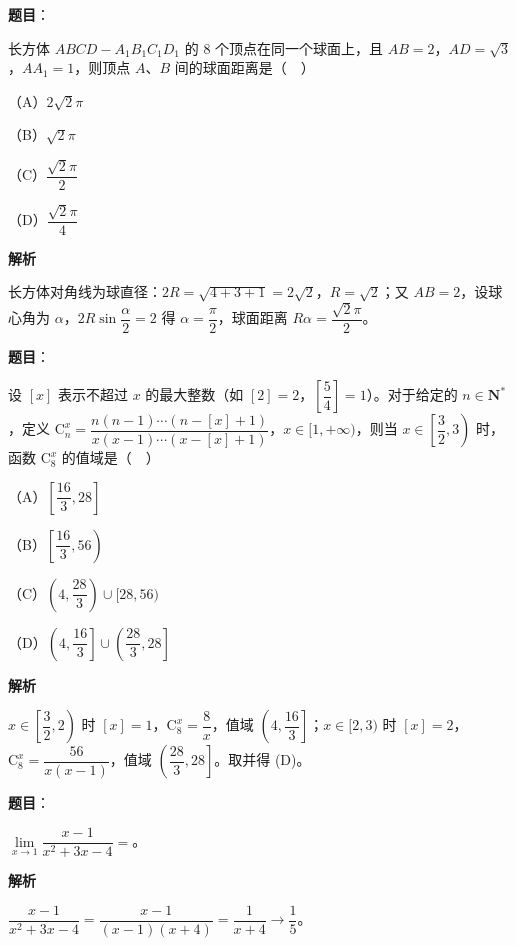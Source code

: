 \begin{answer}

\textbf{题目}：

长方体 $ABCD-A_1B_1C_1D_1$ 的 $8$ 个顶点在同一个球面上，且 $AB=2$，$AD=\sqrt3$，$AA_1=1$，则顶点 $A$、$B$ 间的球面距离是（　）

（A）$2\sqrt2\pi$

（B）$\sqrt2\pi$

（C）$\dfrac{\sqrt2\pi}2$

（D）$\dfrac{\sqrt2\pi}4$

\textbf{解析}

长方体对角线为球直径：$2R=\sqrt{4+3+1}=2\sqrt2$，$R=\sqrt2$；又 $AB=2$，设球心角为 $\alpha$，$2R\sin\dfrac\alpha2=2$ 得 $\alpha=\dfrac\pi2$，球面距离 $R\alpha=\dfrac{\sqrt2\pi}2$。


\end{answer}
\begin{answer}

\textbf{题目}：

设 $[x]$ 表示不超过 $x$ 的最大整数（如 $[2]=2$，$\left[\dfrac54\right]=1$）。对于给定的 $n\in\mathbf N^*$，定义 $\mathrm C_n^x=\dfrac{n(n-1)\cdots(n-[x]+1)}{x(x-1)\cdots(x-[x]+1)}$，$x\in[1,+\infty)$，则当 $x\in\left[\dfrac32,3\right)$ 时，函数 $\mathrm C_8^x$ 的值域是（　）

（A）$\left[\dfrac{16}3,28\right]$

（B）$\left[\dfrac{16}3,56\right)$

（C）$\left(4,\dfrac{28}3\right)\cup[28,56)$

（D）$\left(4,\dfrac{16}3\right]\cup\left(\dfrac{28}3,28\right]$

\textbf{解析}

$x\in\left[\dfrac32,2\right)$ 时 $[x]=1$，$\mathrm C_8^x=\dfrac8x$，值域 $\left(4,\dfrac{16}3\right]$；$x\in[2,3)$ 时 $[x]=2$，$\mathrm C_8^x=\dfrac{56}{x(x-1)}$，值域 $\left(\dfrac{28}3,28\right]$。取并得 (D)。


\end{answer}
\begin{answer}

\textbf{题目}：

$\lim\limits_{x\to1}\dfrac{x-1}{x^2+3x-4}=$\gkblank{}。

\textbf{解析}

$\dfrac{x-1}{x^2+3x-4}=\dfrac{x-1}{(x-1)(x+4)}=\dfrac1{x+4}\to\dfrac15$。


\end{answer}
